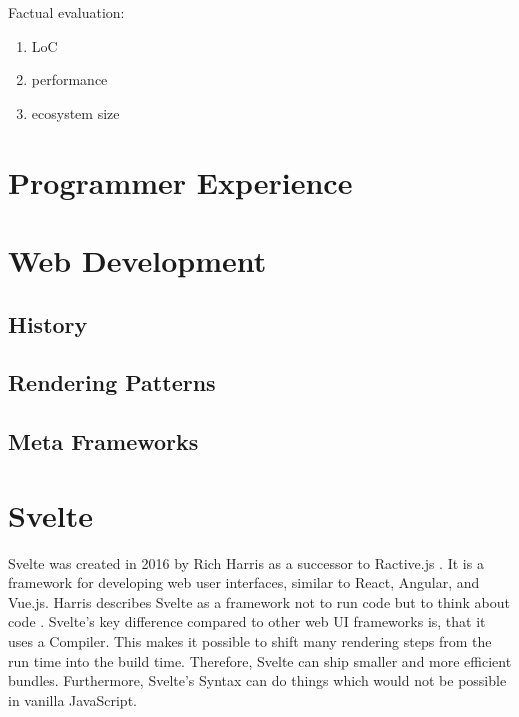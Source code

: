 Factual evaluation:
\begin{enumerate}
    \item LoC
    \item performance
    \item ecosystem size
\end{enumerate}

\section{Programmer Experience}


\section{Web Development}
\label{sec:web-development}

\subsection{History}

\subsection{Rendering Patterns}

\subsection{Meta Frameworks}

\section{Svelte}
\label{sec:svelte}

% 
% 
% 
% 

Svelte was created in 2016 by Rich Harris as a successor to Ractive.js \cite{offerzen_origins_svelte_2022}. It is a framework for developing web user interfaces, similar to React, Angular, and Vue.js. Harris describes Svelte as a framework not to run code but to think about code \cite{offerzen_origins_svelte_2022}. Svelte's key difference compared to other web UI frameworks is, that it uses a Compiler. This makes it possible to shift many rendering steps from the run time into the build time. Therefore, Svelte can ship smaller and more efficient bundles. Furthermore, Svelte's Syntax can do things which would not be possible in vanilla JavaScript.  

